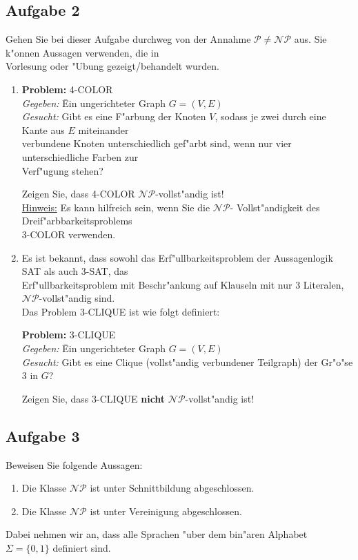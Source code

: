 \documentclass[10pt,oneside,onecolumn,a4paper,german,titlepage]{article}
\begin{document}
\subsection*{Aufgabe 2}
Gehen Sie bei dieser Aufgabe durchweg von der Annahme $\mathcal{P} \neq \mathcal{NP}$
aus. Sie k"onnen Aussagen verwenden, die in\\
Vorlesung oder "Ubung gezeigt/behandelt wurden.
\begin{enumerate}
\item
\begin{tabbing}
\textbf{Problem:} 4-COLOR\\
\textit{Gegeben:} \= Ein ungerichteter Graph $G = (V,E)$\\
\textit{Gesucht:} \> Gibt es eine F"arbung der Knoten $V$, sodass je zwei durch eine
Kante aus $E$ miteinander\\
\> verbundene Knoten unterschiedlich gef"arbt sind, wenn nur vier unterschiedliche
Farben zur\\
\> Verf"ugung stehen?
\end{tabbing}
Zeigen Sie, dass 4-COLOR $\mathcal{NP}$-vollst"andig ist!\\
\underline{Hinweis:} Es kann hilfreich sein, wenn Sie die $\mathcal{NP}$-
Vollst"andigkeit des Dreif"arbbarkeitsproblems\\
3-COLOR verwenden.
\item
Es ist bekannt, dass sowohl das Erf"ullbarkeitsproblem der Aussagenlogik SAT als
auch 3-SAT, das\\
Erf"ullbarkeitsproblem mit Beschr"ankung auf Klauseln mit nur 3
Literalen, $\mathcal{NP}$-vollst"andig sind.\\
Das Problem 3-CLIQUE ist wie folgt definiert:
\begin{tabbing}
\textbf{Problem:} 3-CLIQUE\\
\textit{Gegeben:} \= Ein ungerichteter Graph $G = (V,E)$\\
\textit{Gesucht:} \> Gibt es eine Clique (vollst"andig verbundener Teilgraph) der
Gr"o"se $3$ in $G$?
\end{tabbing}
Zeigen Sie, dass 3-CLIQUE \textbf{nicht} $\mathcal{NP}$-vollst"andig ist!
\end{enumerate}

\subsection*{Aufgabe 3}
Beweisen Sie folgende Aussagen:
\begin{enumerate}
\item Die Klasse $\mathcal{NP}$ ist unter Schnittbildung abgeschlossen.
\item Die Klasse $\mathcal{NP}$ ist unter Vereinigung abgeschlossen.
\end{enumerate}
Dabei nehmen wir an, dass alle Sprachen "uber dem bin"aren Alphabet $\Sigma =
\{0,1\}$ definiert sind.
\end{document}
